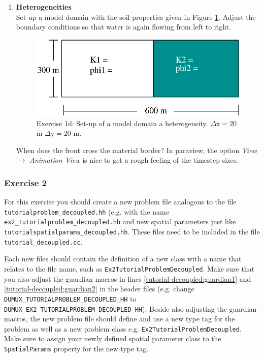 \begin{enumerate}
\item \textbf{Heterogeneities}  \\
Set up a model domain with the soil properties given in Figure \ref{tutorial-deoucpled:exercise1_d}. Adjust the boundary conditions so that water is again flowing from left to right.
\begin{figure}[ht]
\centering
\includegraphics[width=0.5\linewidth,keepaspectratio]{EPS/exercise1_c.eps}
\caption{Exercise 1d: Set-up of a model domain a heterogeneity. $\Delta \text{x} = 20$ m $\Delta \text{y} = 20$ m.}\label{tutorial-deoucpled:exercise1_d}
\end{figure}
When does the front cross the material border? In paraview, the option \textit{View} $\rightarrow$ \textit{Animation View} is nice to get a rough feeling of the timestep sizes.
\end{enumerate}

\subsubsection{Exercise 2}
For this exercise you should create a new problem file analogous to
the file \texttt{tutorialproblem\_decoupled.hh} (e.g. with the name 
\texttt{ex2\_tutorialproblem\_decoupled.hh} and new spatial parameters 
just like \texttt{tutorialspatialparams\_decoupled.hh}. These files need to
be included in the file \texttt{tutorial\_decoupled.cc}. 

Each new files should contain the definition of a new class with a 
name that relates to the file name, such as \texttt{Ex2TutorialProblemDecoupled}. 
Make sure that you also adjust the guardian
macros in lines \ref{tutorial-decoupled:guardian1} and \ref{tutorial-decoupled:guardian2}
 in the header files (e.g. change \\
\texttt{DUMUX\_TUTORIALPROBLEM\_DECOUPLED\_HH} to
\texttt{DUMUX\_EX2\_TUTORIALPROBLEM\_DECOUPLED\_HH}).  Beside also adjusting the guardian macros, 
the new problem file should define and use a new type tag for the problem as well as a new problem class
e.g. \texttt{Ex2TutorialProblemDecoupled}. Make sure to assign your newly defined spatial 
parameter class to the \texttt{SpatialParams} property for the new 
type tag. 

